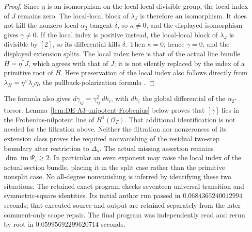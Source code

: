 \begin{proof}
Since \(\eta\) is an isomorphism on the local-local divisible group,
the local index of \(J\) remains zero. The local-local block of
\(\lambda_J\) is therefore an isomorphism. It does not kill the
nonzero local \(\alpha _2\) tangent \(\delta\), so \(\kappa\ne0\),
and the displayed isomorphism gives \(\gamma\ne0\).
If the local index is positive instead, the local-local block of
\(\lambda_J\) is divisible by \([2]\), so its differential kills
\(\delta\). Then \(\kappa=0\), hence \(\gamma=0\), and the displayed
extension splits. The local index here is that of the actual line
bundle \(H=\eta^*J\), which agrees with that of \(J\); it is not
silently replaced by the index of a primitive root of \(H\).
Here preservation of the local index also follows directly from
\(\lambda_H=\eta^\vee\lambda_J\eta\), the pullback-polarization formula
\cite[Proposition~7.6 and proof, p.~100]{EdixhovenVanDerGeerMoonenAV}.
\end{proof}

\begin{remark}
\label{rem:DE-A3-primitive-unipotent-scope}
The formula also gives \(d\gamma_{ij}=\gamma_{ij}^2\,dh_i\), with
\(dh_i\) the global differential of the \(\alpha _2\)-torsor.
Lemma~\ref{lem:DE-A3-unipotent-Frobenius} below proves that
\([\gamma]\) lies in the Frobenius-nilpotent line of
\(H^1(\mathcal O_T)\). That additional identification is not needed
for the filtration above.
Neither the filtration nor nonzeroness of its extension class proves
the required nonvanishing of the residual two-step boundary after
restriction to \(\Delta_s\). The actual missing assertion remains
\(\dim\operatorname{im}\Psi_s\ge2\).
In particular an even exponent may raise the local index of the actual
section bundle, placing it in the split case rather than the primitive
nonsplit case. No all-degree nonvanishing is inferred by identifying
these two situations.
The retained exact program
checks seventeen universal transition and symmetric-square identities.
Its initial author run passed in $0.0684365240012994$ seconds; that
executed source and output are retained separately from the later
comment-only scope repair. The final program was independently read
and rerun by root in $0.05995692299620714$ seconds.
\end{remark}
